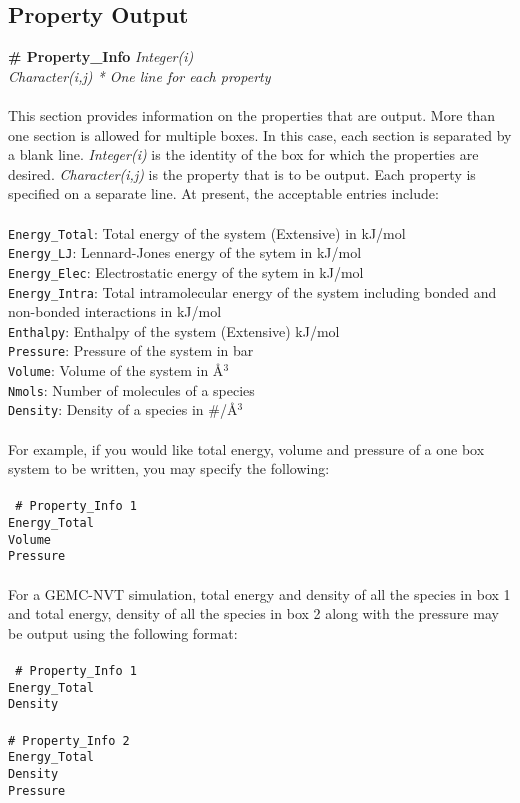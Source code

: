 \subsection{Property Output}\label{sec:Property_Info}
{\bf \# Property\_Info} {\it Integer(i)} \\
{\it Character(i,j) * One line for each property} \\ \\
%
This section provides information on the properties that are output. More than one section is
allowed for multiple boxes. In this case, each section is separated by a blank line. {\it 
Integer(i)} is the identity of the box for which the properties are desired. {\it Character(i,j)}
is the property that is to be output. Each property is specified on a separate line. At present,
the acceptable entries include: \\ \\
%
\texttt{Energy\_Total}: Total energy of the system (Extensive) in kJ/mol \\
\texttt{Energy\_LJ}: Lennard-Jones energy of the sytem in kJ/mol \\
\texttt{Energy\_Elec}: Electrostatic energy of the sytem in kJ/mol \\
\texttt{Energy\_Intra}: Total intramolecular energy of the system including bonded and non-bonded 
interactions in kJ/mol \\
\texttt{Enthalpy}: Enthalpy of the system (Extensive) kJ/mol \\
\texttt{Pressure}: Pressure of the system in bar \\
\texttt{Volume}: Volume of the system in \AA$^3$ \\
\texttt{Nmols}: Number of molecules of a species \\
\texttt{Density}: Density of a species in \#/\AA$^3$ \\ \\
%
For example, if you would like total energy, volume and pressure of a one box system to be written, you may 
specify the following: \\ \\
%
\texttt{
\# Property\_Info 1 \\
Energy\_Total \\ 
Volume \\ 
Pressure \\ \\}
%
For a GEMC-NVT simulation, total energy and density of all the species in box 1 and total energy, density of
all the species in box 2 along with the pressure may be output using the following format: \\ \\
%
\texttt{
\# Property\_Info 1 \\
Energy\_Total \\
Density \\ \\
%
\# Property\_Info 2 \\
Energy\_Total \\
Density \\ 
Pressure }
%
%
%
